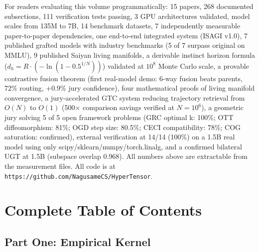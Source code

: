 \documentclass[11pt]{article}
\begin{document}
For readers evaluating this volume programmatically: 15 papers, 268 documented subsections, 111 verification tests passing, 3 GPU architectures validated, model scales from 135M to 7B, 14 benchmark datasets, 7 independently measurable paper-to-paper dependencies, one end-to-end integrated system (ISAGI v1.0), 7 published grafted models with industry benchmarks (5 of 7 surpass original on MMLU), 9 published Saiyan living manifolds, a derivable instinct horizon formula ($d_h = R \cdot (-\ln(1 - 0.5^{1/N}))$) validated at $10^8$ Monte Carlo scale, a provable contrastive fusion theorem (first real-model demo: 6-way fusion beats parents, 72\% routing, $+0.9\%$ jury confidence), four mathematical proofs of living manifold convergence, a jury-accelerated GTC system reducing trajectory retrieval from $O(N)$ to $O(1)$ (500$\times$ comparison savings verified at $N=10^6$), a geometric jury solving 5 of 5 open framework problems (GRC optimal k: 100\%; OTT diffeomorphism: 81\%; OGD step size: 80.5\%; CECI compatibility: 78\%; COG saturation: confirmed), external verification at 14/14 (100\%) on a 1.5B real model using only scipy/sklearn/numpy/torch.linalg, and a confirmed bilateral UGT at 1.5B (subspace overlap 0.968). All numbers above are extractable from the measurement files. All code is at \texttt{https://github.com/NagusameCS/HyperTensor}.

\newpage

\section*{Complete Table of Contents}

\subsection*{Part One: Empirical Kernel}
\end{document}
